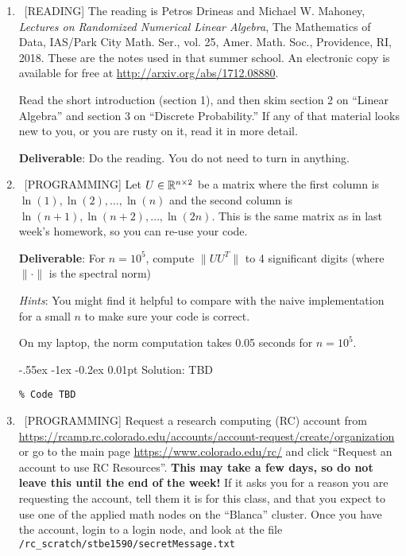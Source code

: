\documentclass[10pt, letterpaper]{scrartcl}
\makeatletter
\newlength{\savedparindent}
\newcommand\solParagraph{\@startsection{paragraph}{4}{\z@}%
    {-.55ex \@plus -1ex \@minus -0.2ex}%
    {0.01pt}%
    {\raggedsection\normalfont\sectfont\nobreak\size@paragraph}%
}
\newenvironment{solution}{\setlength{\parindent}{\savedparindent}\solParagraph{Solution:}}{}
\makeatother
\begin{document}
\begin{enumerate}[align=left, leftmargin=*, label=\bfseries Problem \arabic*:]   
    \item \ [READING]  The reading is 
Petros Drineas and Michael W. Mahoney, \emph{Lectures on Randomized Numerical Linear Algebra}, The Mathematics of Data, IAS/Park City Math. Ser., vol. 25, Amer. Math. Soc., Providence, RI, 2018. These are the notes used in that summer school. An electronic copy is available for free at \url{http://arxiv.org/abs/1712.08880}.

Read the short introduction (section 1), and then skim section 2 on ``Linear Algebra'' and section 3 on ``Discrete Probability.'' If any of that material looks new to you, or you are rusty on it, read it in more detail.

\textbf{Deliverable}: Do the reading. You do not need to turn in anything.


         
    \item \ [PROGRAMMING] Let $U \in \mathbb{R}^{n \times 2}$ be a matrix where the first column is $\ln(1),\ln(2),\ldots,\ln(n)$ and the second column is 
    $\ln(n+1),\ln(n+2),\ldots,\ln(2n)$.  This is the same matrix as in last week's homework, so you can re-use your code.

    \textbf{Deliverable}: For $n=10^5$, compute $\| UU^T\|$ to 4 significant digits (where $\| \cdot \|$ is the spectral norm)
    
    \emph{Hints}:    
    You might find it helpful to compare with the naive implementation for a small $n$ to make sure your code is correct.
    
    On my laptop, the norm computation takes 0.05 seconds for $n=10^5$.
    
\begin{solution}
TBD
\begin{lstlisting}
% Code TBD
\end{lstlisting}
\end{solution}
    
    \item \ [PROGRAMMING] 
    Request a research computing (RC) account from \url{https://rcamp.rc.colorado.edu/accounts/account-request/create/organization} or go to the main page \url{https://www.colorado.edu/rc/} and click ``Request an account to use RC Resources''. \textbf{This may take a few days, so do not leave this until the end of the week!}  If it asks you for a reason you are requesting the account, tell them it is for this class, and that you expect to use one of the applied math nodes on the ``Blanca'' cluster. 
     Once you have the account, login to a login node, and look at the file \texttt{/rc\_scratch/stbe1590/secretMessage.txt}
    

\end{enumerate}
\end{document}
